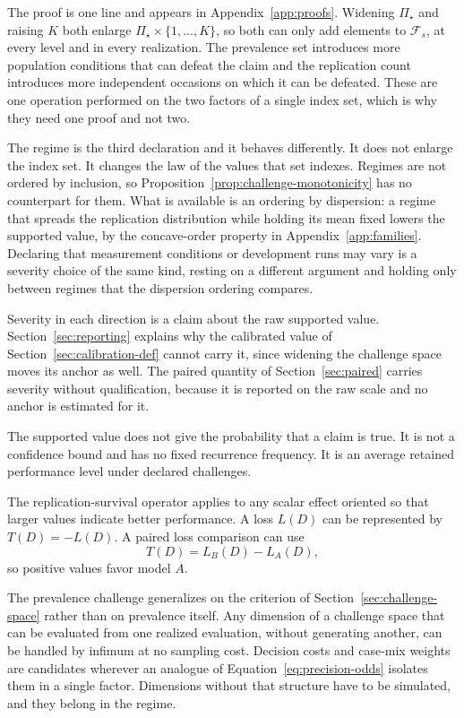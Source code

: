 \documentclass[11pt]{article}
\newcommand{\PSet}{\Pi_\star}
\newcommand{\RefSet}{\mathcal{F}}
\theoremstyle{remark}
\begin{document}
The proof is one line and appears in Appendix~\ref{app:proofs}. Widening $\PSet$ and raising $K$ both enlarge $\PSet\times\{1,\ldots,K\}$, so both can only add elements to $\RefSet_s$, at every level and in every realization. The prevalence set introduces more population conditions that can defeat the claim and the replication count introduces more independent occasions on which it can be defeated. These are one operation performed on the two factors of a single index set, which is why they need one proof and not two.

The regime is the third declaration and it behaves differently. It does not enlarge the index set. It changes the law of the values that set indexes. Regimes are not ordered by inclusion, so Proposition~\ref{prop:challenge-monotonicity} has no counterpart for them. What is available is an ordering by dispersion: a regime that spreads the replication distribution while holding its mean fixed lowers the supported value, by the concave-order property in Appendix~\ref{app:families}. Declaring that measurement conditions or development runs may vary is a severity choice of the same kind, resting on a different argument and holding only between regimes that the dispersion ordering compares.

Severity in each direction is a claim about the raw supported value. Section~\ref{sec:reporting} explains why the calibrated value of Section~\ref{sec:calibration-def} cannot carry it, since widening the challenge space moves its anchor as well. The paired quantity of Section~\ref{sec:paired} carries severity without qualification, because it is reported on the raw scale and no anchor is estimated for it.

The supported value does not give the probability that a claim is true. It is not a confidence bound and has no fixed recurrence frequency. It is an average retained performance level under declared challenges.

The replication-survival operator applies to any scalar effect oriented so that larger values indicate better performance. A loss $L(D)$ can be represented by $T(D)=-L(D)$. A paired loss comparison can use
\[
T(D)=L_B(D)-L_A(D),
\]
so positive values favor model $A$.

The prevalence challenge generalizes on the criterion of Section~\ref{sec:challenge-space} rather than on prevalence itself. Any dimension of a challenge space that can be evaluated from one realized evaluation, without generating another, can be handled by infimum at no sampling cost. Decision costs and case-mix weights are candidates wherever an analogue of Equation~\eqref{eq:precision-odds} isolates them in a single factor. Dimensions without that structure have to be simulated, and they belong in the regime.
\end{document}
